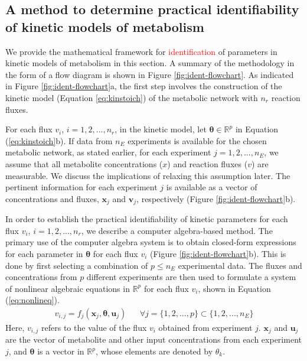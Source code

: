 \documentclass[10pt]{article}
\begin{document}
	\subsection{A method to determine practical identifiability of kinetic models of metabolism}\label{sec:ident}
	We provide the mathematical framework for \textcolor{red}{identification} of parameters in kinetic models of metabolism in this section. A summary of the methodology in the form of a flow diagram is shown in Figure \ref{fig:ident-flowchart}. As indicated in Figure \ref{fig:ident-flowchart}a, the first step involves the construction of the kinetic model (Equation \ref{eq:kinstoich}) of the metabolic network with $n_r$ reaction fluxes.
	
	
	For each flux $v_i$, $i={1, 2, ..., n_r}$, in the kinetic model, let $\mathbf{\theta} \in \mathbb{R}^p$ in Equation (\ref{eq:kinstoich}b). If data from $n_E$ experiments is available for the chosen metabolic network, as stated earlier, for each experiment $j = {1, 2, ..., n_E}$, we assume that all metabolite concentrations ($x$) and reaction fluxes ($v$) are measurable. We discuss the implications of relaxing this assumption later. The pertinent information for each experiment $j$ is available as a vector of concentrations and fluxes, $\mathbf{x}_j$ and $\mathbf{v}_j$, respectively (Figure \ref{fig:ident-flowchart}b). 
	
	In order to establish the practical identifiability of kinetic parameters for each flux $v_i$, $i={1, 2, ..., n_r}$, we describe a computer algebra-based method. The primary use of the computer algebra system is to obtain closed-form expressions for each parameter in $\mathbf{\theta}$ for each flux $v_i$ (Figure \ref{fig:ident-flowchart}b). This is done by first selecting a combination of $p\le n_E$ experimental data. The fluxes and concentrations from $p$ different experiments are then used to formulate a system of nonlinear algebraic equations in $\mathbb{R}^p$ for each flux $v_i$, shown in Equation (\ref{eq:nonlineq}). 
	\begin{align}\label{eq:nonlineq}
	v_{i, j} = f_j(\mathbf{x}_j,\mathbf{\theta}, \mathbf{u}_j) && \forall j=\{1, 2, ..., p\}\subset\{1, 2, ..., n_E\}
	\end{align}
	Here, $v_{i,j}$ refers to the value of the flux $v_i$ obtained from experiment $j$. $\mathbf{x}_j$ and $\mathbf{u}_j$ are the vector of metabolite and other input concentrations from each experiment $j$, and $\mathbf{\theta}$ is a vector in $\mathbb{R}^p$, whose elements are denoted by $\theta_k$.
	
\end{document}
